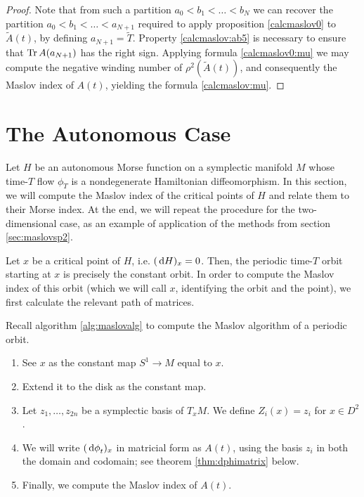 \begin{proof}
Note that from such a partition $a_0 < b_1 < \dots < b_N$ we can recover the partition $a_0 < b_1 < \dots < a_{N+1}$ required to apply proposition \ref{calcmaslov0} to $\tilde A(t)$, by defining $a_{N+1} = \tilde T$. Property \ref{calcmaslov:ab5} is necessary to ensure that $\operatorname{Tr} A(a_{N+1})$ has the right sign. Applying formula \eqref{calcmaslov0:mu} we may compute the negative winding number of $\rho^2(\tilde A(t))$, and consequently the Maslov index of $A(t)$, yielding the formula \ref{calcmaslov:mu}.
\end{proof}

\section{The Autonomous Case}

Let $H$ be an autonomous Morse function on a symplectic manifold $M$ whose time-$T$ flow $\phi_T$ is a nondegenerate Hamiltonian diffeomorphism. In this section, we will compute the Maslov index of the critical points of $H$ and relate them to their Morse index. At the end, we will repeat the procedure for the two-dimensional case, as an example of application of the methods from section \ref{sec:maslovsp2}.

Let $x$ be a critical point of $H$, i.e. $(\dl H)_x = 0$. Then, the periodic time-$T$ orbit starting at $x$ is precisely the constant orbit. In order to compute the Maslov index of this orbit (which we will call $x$, identifying the orbit and the point), we first calculate the relevant path of matrices.

Recall algorithm \ref{alg:maslovalg} to compute the Maslov algorithm of a periodic orbit.
\begin{enumerate}[algorithm]
\item See $x$ as the constant map $S^1 \to M$ equal to $x$.
\item Extend it to the disk as the constant map.
\item Let $z_1, \dots, z_{2n}$ be a symplectic basis of $T_x M$. We define $Z_i(x) = z_i$ for $x \in D^2$.
\item We will write $(\dl \phi_t)_x$ in matricial form as $A(t)$, using the basis $z_i$ in both the domain and codomain; see theorem \ref{thm:dphimatrix} below.
\item Finally, we compute the Maslov index of $A(t)$.
\end{enumerate}

